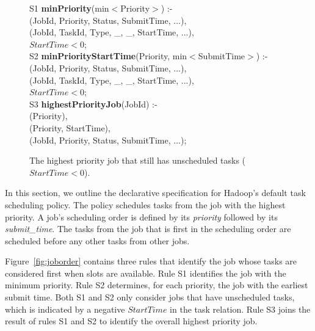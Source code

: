 \begin{figure}
\label{fig:joborder}
\ssp
\centering
\begin{boxedminipage}{\linewidth}
S1 {\bf minPriority}(min$<$Priority$>$) :- \\
(JobId, Priority, Status, SubmitTime, ...), \\
(JobId, TaskId, Type, \_, \_, StartTime, ...), \\
\datalogspace $StartTime < 0$; \\
	
S2 {\bf minPriorityStartTime}(Priority, min$<$SubmitTime$>$) :- \\
(JobId, Priority, Status, SubmitTime, ...), \\
(JobId, TaskId, Type, \_, \_, StartTime, ...), \\
\datalogspace $StartTime < 0$; \\

S3 {\bf highestPriorityJob}(JobId) :- \\
(Priority), \\
(Priority, StartTime), \\
(JobId, Priority, Status, SubmitTime, ...); \\
\end{boxedminipage}
\caption{\label{fig:planseed}The highest priority job that still has unscheduled tasks ($StartTime < 0$).}
\end{figure}

In this section, we outline the declarative specification for Hadoop's default
task scheduling policy. The policy schedules tasks from the job with the
highest priority. A job's scheduling order is defined by its {\em priority} followed by its 
{\em submit\_time}. The tasks from the job that is first in the scheduling order are
scheduled before any other tasks from other jobs. 

Figure~\ref{fig:joborder} contains three rules that identify the job whose tasks are considered first
when \TT slots are available. Rule S1 identifies the job with the minimum priority. Rule S2 determines,
for each priority, the job with the earliest submit time. Both S1 and S2 only consider jobs that have unscheduled
tasks, which is indicated by a negative $StartTime$ in the task relation. Rule S3 joins the result of rules S1 and S2
to identify the overall highest priority job. 

